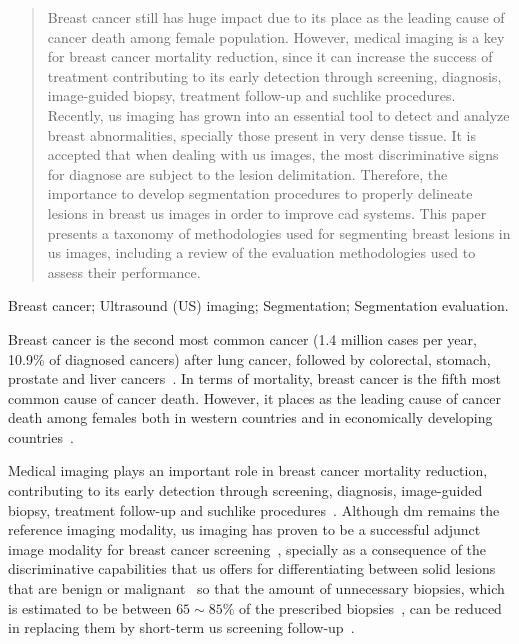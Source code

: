 \documentclass[authoryear,preprint,review,12pt]{elsarticle}
\begin{document}
\begin{frontmatter}
\begin{abstract}
Breast cancer still has huge impact due to its place as the leading cause of cancer death among female population. However, medical imaging is a key for breast cancer mortality reduction, since it can increase the success of treatment contributing to its early detection through screening, diagnosis, image-guided biopsy, treatment follow-up and suchlike procedures. Recently, \ac{us} imaging has grown into an essential tool to detect and analyze breast abnormalities, specially those present in very dense tissue. It is accepted that when dealing with \ac{us} images, the most discriminative signs for diagnose are subject to the lesion delimitation. Therefore, the importance to develop segmentation procedures to properly delineate lesions in breast \ac{us} images in order to improve \ac{cad} systems. This paper presents a taxonomy of methodologies used for segmenting breast lesions in \ac{us} images, including a review of the evaluation methodologies used to assess their performance.




\end{abstract}

\begin{keyword}

Breast cancer; Ultrasound (US) imaging; Segmentation; Segmentation evaluation.
\end{keyword}

\end{frontmatter}

 \linenumbers

\graphicspath{{./figures/}}

Breast cancer is the second most common cancer (1.4 million cases per year, 10.9\% of  diagnosed cancers) after lung cancer, followed by colorectal, stomach, prostate and liver cancers~\cite{Ferlay2010}. 
In terms of mortality, breast cancer is the fifth most common cause of cancer death. However, it places as the leading cause of cancer death among females both in western countries and in economically developing countries~\cite{cancerStatistics2011}.

Medical imaging plays an important role in breast cancer mortality reduction, contributing to its early detection through screening, diagnosis, image-guided biopsy, treatment follow-up and suchlike procedures~\cite{smith2003american}.
Although \ac{dm} remains the reference imaging modality, \ac{us} imaging has proven to be a successful adjunct image modality for breast cancer screening~\cite{smith2003american,berg2004diagnostic}, specially as a consequence of the discriminative capabilities that \ac{us} offers for differentiating between solid lesions that are benign or malignant~\cite{Stavros:1995p12392} so that the amount of unnecessary biopsies, which is estimated to be between $65\sim85\%$ of the prescribed biopsies~\cite{yuan2010multimodality}, can be reduced~\cite{ciatto1994contribution} in replacing them by short-term \ac{us} screening follow-up~\cite{gordon1995malignant}.
\end{document}
